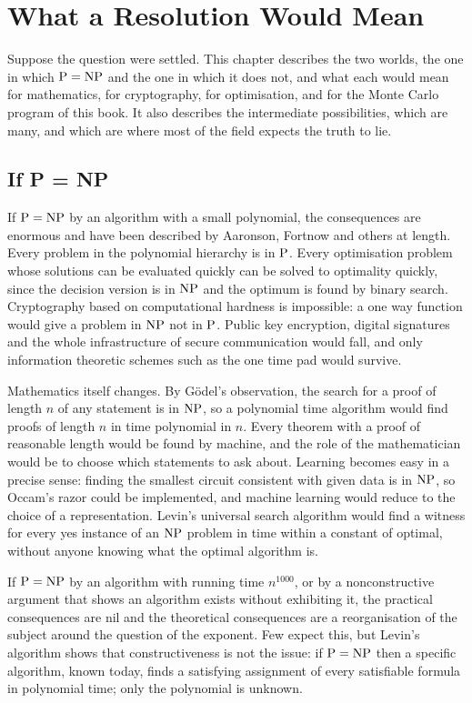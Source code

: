 \chapter{What a Resolution Would Mean}
\label{ch:consequences}

Suppose the question were settled. This chapter describes the two worlds, the one in which $\mathrm{P} = \mathrm{NP}$ and the one in which it does not, and what each would mean for mathematics, for cryptography, for optimisation, and for the Monte Carlo program of this book. It also describes the intermediate possibilities, which are many, and which are where most of the field expects the truth to lie.

\section{If P = NP}

If $\mathrm{P} = \mathrm{NP}$ by an algorithm with a small polynomial, the consequences are enormous and have been described by Aaronson, Fortnow and others at length. Every problem in the polynomial hierarchy is in $\mathrm{P}$. Every optimisation problem whose solutions can be evaluated quickly can be solved to optimality quickly, since the decision version is in $\mathrm{NP}$ and the optimum is found by binary search. Cryptography based on computational hardness is impossible: a one way function would give a problem in $\mathrm{NP}$ not in $\mathrm{P}$. Public key encryption, digital signatures and the whole infrastructure of secure communication would fall, and only information theoretic schemes such as the one time pad would survive.

Mathematics itself changes. By G\"odel's observation, the search for a proof of length $n$ of any statement is in $\mathrm{NP}$, so a polynomial time algorithm would find proofs of length $n$ in time polynomial in $n$. Every theorem with a proof of reasonable length would be found by machine, and the role of the mathematician would be to choose which statements to ask about. Learning becomes easy in a precise sense: finding the smallest circuit consistent with given data is in $\mathrm{NP}$, so Occam's razor could be implemented, and machine learning would reduce to the choice of a representation. Levin's universal search algorithm would find a witness for every yes instance of an $\mathrm{NP}$ problem in time within a constant of optimal, without anyone knowing what the optimal algorithm is.

If $\mathrm{P} = \mathrm{NP}$ by an algorithm with running time $n^{1000}$, or by a nonconstructive argument that shows an algorithm exists without exhibiting it, the practical consequences are nil and the theoretical consequences are a reorganisation of the subject around the question of the exponent. Few expect this, but Levin's algorithm shows that constructiveness is not the issue: if $\mathrm{P} = \mathrm{NP}$ then a specific algorithm, known today, finds a satisfying assignment of every satisfiable formula in polynomial time; only the polynomial is unknown.


